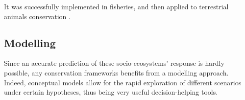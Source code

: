 \documentclass[12pt,a4paper]{article}
\begin{document}

It was successfully implemented in fisheries, and then applied to terrestrial animals conservation \citep{BUNNEFELD2011441, bunnefeld2013incentivizing}.


\subsection{Modelling}

Since an accurate prediction of these socio-ecosystems' response is hardly possible, any conservation frameworks benefits from a modelling approach. %
Indeed, conceptual models allow for the rapid exploration of different scenarios under certain hypotheses, thus being very useful decision-helping tools. %
%
\end{document}

